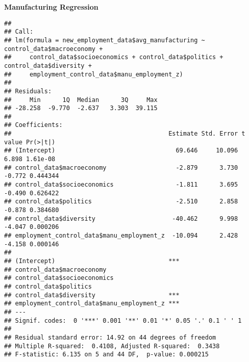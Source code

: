\documentclass[
]{article}
\newenvironment{Shaded}{\begin{snugshade}}{\end{snugshade}}
\newcommand{\CommentTok}[1]{\textcolor[rgb]{0.56,0.35,0.01}{\textit{#1}}}
\newcommand{\FunctionTok}[1]{\textcolor[rgb]{0.13,0.29,0.53}{\textbf{#1}}}
\newcommand{\NormalTok}[1]{#1}
\newcommand{\OtherTok}[1]{\textcolor[rgb]{0.56,0.35,0.01}{#1}}
\newcommand{\SpecialCharTok}[1]{\textcolor[rgb]{0.81,0.36,0.00}{\textbf{#1}}}
\begin{document}
\textbf{Manufacturing Regression}

\begin{Shaded}
\end{Shaded}

\begin{verbatim}
## 
## Call:
## lm(formula = new_employment_data$avg_manufacturing ~ control_data$macroeconomy + 
##     control_data$socioeconomics + control_data$politics + control_data$diversity + 
##     employment_control_data$manu_employment_z)
## 
## Residuals:
##     Min      1Q  Median      3Q     Max 
## -28.258  -9.770  -2.637   3.303  39.115 
## 
## Coefficients:
##                                           Estimate Std. Error t value Pr(>|t|)
## (Intercept)                                 69.646     10.096   6.898 1.61e-08
## control_data$macroeconomy                   -2.879      3.730  -0.772 0.444344
## control_data$socioeconomics                 -1.811      3.695  -0.490 0.626422
## control_data$politics                       -2.510      2.858  -0.878 0.384680
## control_data$diversity                     -40.462      9.998  -4.047 0.000206
## employment_control_data$manu_employment_z  -10.094      2.428  -4.158 0.000146
##                                              
## (Intercept)                               ***
## control_data$macroeconomy                    
## control_data$socioeconomics                  
## control_data$politics                        
## control_data$diversity                    ***
## employment_control_data$manu_employment_z ***
## ---
## Signif. codes:  0 '***' 0.001 '**' 0.01 '*' 0.05 '.' 0.1 ' ' 1
## 
## Residual standard error: 14.92 on 44 degrees of freedom
## Multiple R-squared:  0.4108, Adjusted R-squared:  0.3438 
## F-statistic: 6.135 on 5 and 44 DF,  p-value: 0.000215
\end{verbatim}
\end{document}
